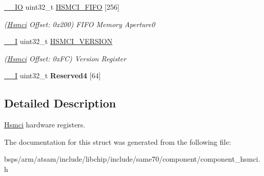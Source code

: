 \begin{DoxyCompactItemize}
\mbox{\hyperlink{core__cm7_8h_aec43007d9998a0a0e01faede4133d6be}{\+\_\+\+\_\+\+IO}} uint32\+\_\+t \mbox{\hyperlink{structHsmci_a92652b5f7f18424f49d460581d88a174}{H\+S\+M\+C\+I\+\_\+\+F\+I\+FO}} \mbox{[}256\mbox{]}
\begin{DoxyCompactList}\small\item\em (\mbox{\hyperlink{structHsmci}{Hsmci}} Offset\+: 0x200) F\+I\+FO Memory Aperture0 \end{DoxyCompactList}\item 
\mbox{\label{structHsmci_aa6715c20a0cb6588dccb18c5fbb3e0db}} 
\mbox{\hyperlink{core__cm7_8h_af63697ed9952cc71e1225efe205f6cd3}{\+\_\+\+\_\+I}} uint32\+\_\+t \mbox{\hyperlink{structHsmci_aa6715c20a0cb6588dccb18c5fbb3e0db}{H\+S\+M\+C\+I\+\_\+\+V\+E\+R\+S\+I\+ON}}
\begin{DoxyCompactList}\small\item\em (\mbox{\hyperlink{structHsmci}{Hsmci}} Offset\+: 0x\+FC) Version Register \end{DoxyCompactList}\item 
\mbox{\label{structHsmci_a0745a3fd5151c995ae6218bdffef5e38}} 
\mbox{\hyperlink{core__cm7_8h_af63697ed9952cc71e1225efe205f6cd3}{\+\_\+\+\_\+I}} uint32\+\_\+t {\bfseries Reserved4} \mbox{[}64\mbox{]}
\end{DoxyCompactItemize}


\subsection{Detailed Description}
\mbox{\hyperlink{structHsmci}{Hsmci}} hardware registers. 

The documentation for this struct was generated from the following file\+:\begin{DoxyCompactItemize}
\item 
bsps/arm/atsam/include/libchip/include/same70/component/component\+\_\+hsmci.\+h\end{DoxyCompactItemize}
